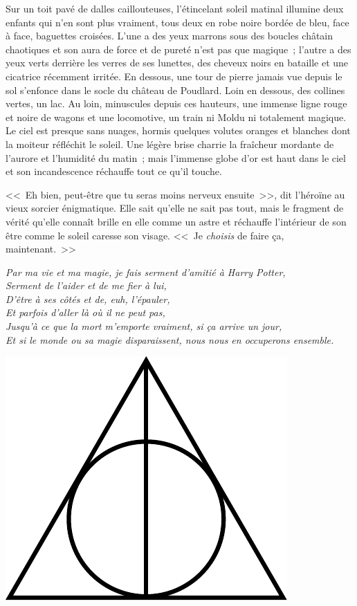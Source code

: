 Sur un toit pavé de dalles caillouteuses, l'étincelant soleil matinal illumine deux enfants qui n'en sont plus vraiment, tous deux en robe noire bordée de bleu, face à face, baguettes croisées. L'une a des yeux marrons sous des boucles châtain chaotiques et son aura de force et de pureté n'est pas que magique~; l'autre a des yeux verts derrière les verres de ses lunettes, des cheveux noirs en bataille et une cicatrice récemment irritée. En dessous, une tour de pierre jamais vue depuis le sol s'enfonce dans le socle du château de Poudlard. Loin en dessous, des collines vertes, un lac. Au loin, minuscules depuis ces hauteurs, une immense ligne rouge et noire de wagons et une locomotive, un train ni Moldu ni totalement magique. Le ciel est presque sans nuages, hormis quelques volutes oranges et blanches dont la moiteur réfléchit le soleil. Une légère brise charrie la fraîcheur mordante de l'aurore et l'humidité du matin~; mais l'immense globe d'or est haut dans le ciel et son incandescence réchauffe tout ce qu'il touche.

<<~Eh bien, peut-être que tu seras moins nerveux ensuite~>>, dit l'héroïne au vieux sorcier énigmatique. Elle sait qu'elle ne sait pas tout, mais le fragment de vérité qu'elle connaît brille en elle comme un astre et réchauffe l'intérieur de son être comme le soleil caresse son visage. <<~Je \emph{choisis} de faire ça, maintenant.~>>

\emph{Par ma vie et ma magie, je fais serment d'amitié à Harry Potter,\\ Serment de l'aider et de me fier à lui,\\ D'être à ses côtés et de, euh, l'épauler,\\ Et parfois d'aller là où il ne peut pas,\\ Jusqu'à ce que la mort m'emporte vraiment, si ça arrive un jour,\\ Et si le monde ou sa magie disparaissent, nous nous en occuperons ensemble.}
\vspace*{\fill}
{
\begin{center}
\includegraphics[scale=0.75]{Deathly_Hallows_Sign.pdf}
\end{center}
}
\vspace*{\fill}
\clearpage


